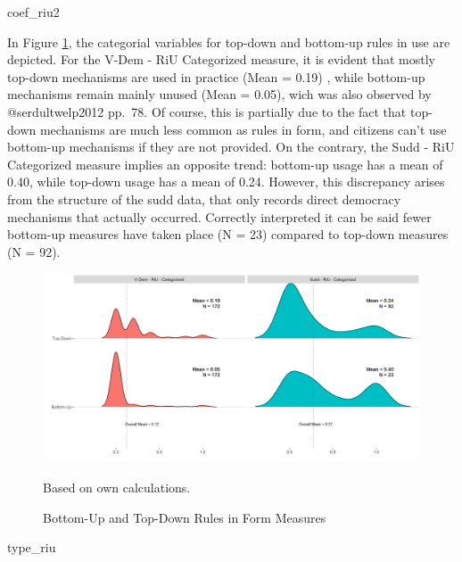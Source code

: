 \documentclass[]{article}
\begin{document}
coef\_riu2

In Figure \ref{type_riu}, the categorial variables for top-down and
bottom-up rules in use are depicted. For the V-Dem - RiU Categorized
measure, it is evident that mostly top-down mechanisms are used in
practice (Mean = 0.19) , while bottom-up mechanisms remain mainly unused
(Mean = 0.05), wich was also observed by @serdultwelp2012 pp.~78. Of
course, this is partially due to the fact that top-down mechanisms are
much less common as rules in form, and citizens can't use bottom-up
mechanisms if they are not provided. On the contrary, the Sudd - RiU
Categorized measure implies an opposite trend: bottom-up usage has a
mean of 0.40, while top-down usage has a mean of 0.24. However, this
discrepancy arises from the structure of the sudd data, that only
records direct democracy mechanisms that actually occurred. Correctly
interpreted it can be said fewer bottom-up measures have taken place (N
= 23) compared to top-down measures (N = 92).

\begin{figure}[!th]
    \caption{Bottom-Up and Top-Down Rules in Form Measures}
    \label{type_riu}
    \includegraphics[width=\textwidth]{images/type_riu.png}
    \flushright
    {\scriptsize Based on own calculations. \par}
\end{figure}

type\_riu
\end{document}
